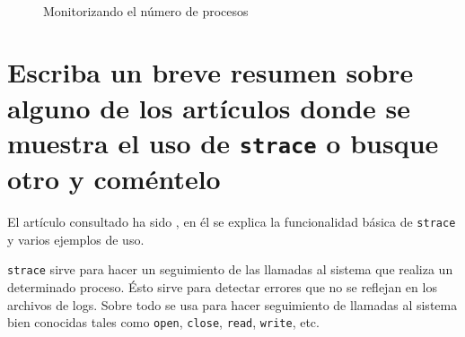 \documentclass[10pt,a4paper,spanish]{article}
\numberwithin{equation}{section} %
\numberwithin{figure}{section} %
\numberwithin{table}{section} %
\begin{document}
\begin{figure}[!h]
\centering
\mbox {
\qquad
{}
}
\caption{Monitorizando el número de procesos}
\label{procesosnumber}
\end{figure}

\section{Escriba un breve resumen sobre alguno de los artículos donde se muestra el uso de \texttt{strace} o busque otro y coméntelo}
El artículo consultado ha sido \cite{strace}, en él se explica la funcionalidad básica de \texttt{strace} y varios ejemplos de uso.

\texttt{strace} sirve para hacer un seguimiento de las llamadas al sistema que realiza un determinado proceso. Ésto sirve para detectar errores que no se reflejan en los archivos de logs. Sobre todo se usa para hacer seguimiento de llamadas al sistema bien conocidas tales como \texttt{open}, \texttt{close}, \texttt{read}, \texttt{write}, etc.
\end{document}
